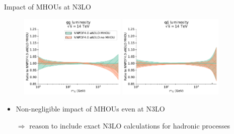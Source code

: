 \documentclass[aspectratio=169, 9pt,t]{beamer}
\begin{document}
\begin{frame}{Impact of MHOUs at N3LO}
  \begin{figure}[!t]
    \centering
    \includegraphics[width=0.45\textwidth]{figures/gg_plot_lumi1d.pdf}
    \includegraphics[width=0.45\textwidth]{figures/qqbar_plot_lumi1d.pdf}
  \end{figure}
  \begin{itemize}
    \item Non-negligible impact of MHOUs even at N3LO
    \item[$\Rightarrow$] reason to include exact N3LO calculations for hadronic processes
  \end{itemize}
\end{frame}
\end{document}
